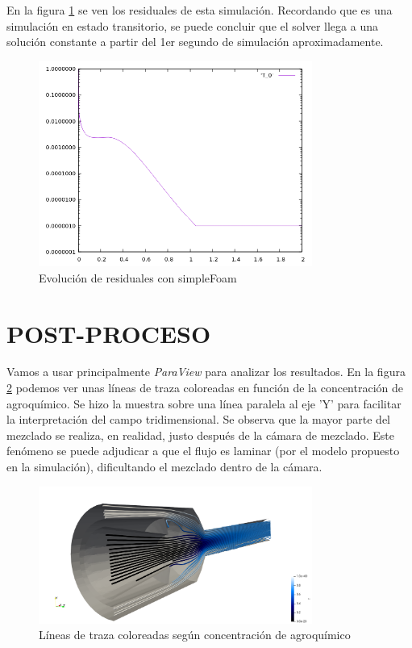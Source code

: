 \documentclass[oneside,a4paper,spanish,links]{amca}
\begin{document}
En la figura \ref{fg:04_stf_res} se ven los residuales de esta simulación. Recordando que es una simulación en estado transitorio, se puede concluir que el solver llega a una solución constante a partir del 1er segundo de simulación aproximadamente.

\begin{figure}[htb]
	\centerline{
		\includegraphics[width=0.8\textwidth]{Figuras/04_STF_RESIDUAL_T.png}}
	\caption{Evolución de residuales con simpleFoam} \label{fg:04_stf_res}
\end{figure}

\section{POST-PROCESO}

Vamos a usar principalmente \textit{ParaView} para analizar los resultados. En la figura \ref{fg:05_stream_t} podemos ver unas líneas de traza coloreadas en función de la concentración de agroquímico. Se hizo la muestra sobre una línea paralela al eje 'Y' para facilitar la interpretación del campo tridimensional. Se observa que la mayor parte del mezclado se realiza, en realidad, justo después de la cámara de mezclado. Este fenómeno se puede adjudicar a que el flujo es laminar (por el modelo propuesto en la simulación), dificultando el mezclado dentro de la cámara.

\begin{figure}[htb]
	\centerline{
		\includegraphics[width=0.8\textwidth]{Figuras/05_STREAMLINES_T.png}}
	\caption{Líneas de traza coloreadas según concentración de agroquímico} \label{fg:05_stream_t}
\end{figure}
\end{document}
